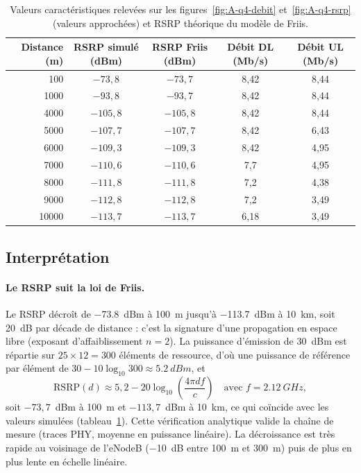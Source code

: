 \begin{table}[H]
\centering
\caption{Valeurs caractéristiques relevées sur les figures~\ref{fig:A-q4-debit}
et~\ref{fig:A-q4-rsrp} (valeurs approchées) et RSRP théorique du modèle de
Friis.}
\label{tab:A-q4}
\small
\begin{tabular}{rcccc}
\toprule
Distance (m) & RSRP simulé (dBm) & RSRP Friis (dBm) & Débit DL (Mb/s) & Débit UL (Mb/s) \\
\midrule
100    & $-73{,}8$  & $-73{,}7$  & 8,42 & 8,44 \\
1000   & $-93{,}8$  & $-93{,}7$  & 8,42 & 8,44 \\
4000   & $-105{,}8$ & $-105{,}8$ & 8,42 & 8,44 \\
5000   & $-107{,}7$ & $-107{,}7$ & 8,42 & 6,43 \\
6000   & $-109{,}3$ & $-109{,}3$ & 8,42 & 4,95 \\
7000   & $-110{,}6$ & $-110{,}6$ & 7,7  & 4,95 \\
8000   & $-111{,}8$ & $-111{,}8$ & 7,2  & 4,38 \\
9000   & $-112{,}8$ & $-112{,}8$ & 7,2  & 3,49 \\
10000  & $-113{,}7$ & $-113{,}7$ & 6,18 & 3,49 \\
\bottomrule
\end{tabular}
\end{table}

\subsection{Interprétation}

\paragraph{Le RSRP suit la loi de Friis.} Le RSRP décroît de
\SI{-73.8}{dBm} à \SI{100}{m} jusqu'à \SI{-113.7}{dBm} à \SI{10}{km}, soit
\SI{20}{dB} par décade de distance : c'est la signature d'une propagation en
espace libre (exposant d'affaiblissement $n=2$). La puissance d'émission de
\SI{30}{dBm} est répartie sur $25\times12=300$ éléments de ressource, d'où une
puissance de référence par élément de $30-10\log_{10}300 \approx \SI{5.2}{dBm}$,
et
\[
  \mathrm{RSRP}(d) \approx 5{,}2 - 20\log_{10}\!\left(\frac{4\pi d f}{c}\right)
  \quad\text{avec } f=\SI{2.12}{GHz},
\]
soit $-73{,}7$~dBm à \SI{100}{m} et $-113{,}7$~dBm à \SI{10}{km}, ce qui
coïncide avec les valeurs simulées (tableau~\ref{tab:A-q4}). Cette vérification
analytique valide la chaîne de mesure (traces PHY, moyenne en puissance linéaire).
La décroissance est très rapide au voisinage de l'eNodeB (\SI{-10}{dB} entre
\SI{100}{m} et \SI{300}{m}) puis de plus en plus lente en échelle linéaire.

